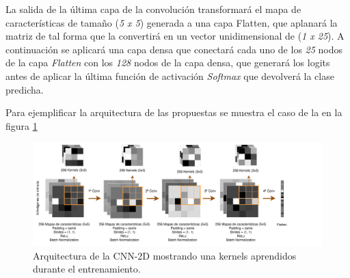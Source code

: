 \begin{enumerate}
                La salida de la última capa de la convolución transformará el mapa de características de tamaño (\textit{5 x 5}) generada a una capa Flatten, que aplanará la matriz de tal forma que la convertirá en un vector unidimensional de (\textit{1 x 25}). A continuación se aplicará una capa densa que conectará cada uno de los \textit{25} nodos de la capa \textit{Flatten} con los \textit{128} nodos de la capa densa, que generará los logits antes de aplicar la última función de activación \textit{Softmax} que devolverá la clase predicha.


                Para ejemplificar la arquitectura de las  propuestas se muestra el caso de la  en la figura \ref{TASPCNNIMAGE}


                \begin{figure}[h]
                    \centering
                    \includegraphics[width=17cm]{archivos/CNN/2D/TASCNN}
                    \caption{Arquitectura de la CNN-2D mostrando una  kernels aprendidos durante el entrenamiento.}
                    \label{TASPCNNIMAGE}
                 \end{figure}


        \end{enumerate}

        \cite{AutoSklearn}

\newpage
